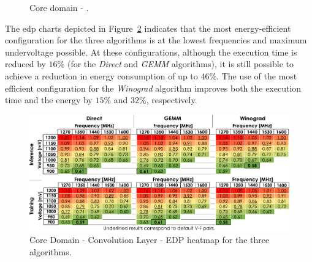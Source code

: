 \begin{figure}[htb]
  \begin{subfigmatrix}{2}
  \end{subfigmatrix}
  \caption{Core domain - .}
  \label{fig:Convolution_behaviour}
\end{figure}

The \acrshort{edp} charts depicted in Figure~\ref{fig:Convolution_EDP} indicates that the most energy-efficient configuration for the three algorithms is at the lowest frequencies and maximum undervoltage possible. At these configurations, although the execution time is reduced by $16\%$ (for the \textit{Direct} and \textit{GEMM} algorithms), it is still possible to achieve a reduction in energy consumption of up to $46\%$. The use of the most efficient configuration for the \textit{Winograd} algorithm improves both the execution time and the energy by $15\%$ and $32\%$, respectively.

\begin{figure}[htbp]
    \centering
        \includegraphics[width=1.0\textwidth]{Figures/Application To Deep Learning/Convolution_EDP.pdf}
        \caption{Core Domain - Convolution Layer - EDP heatmap for the three algorithms.}
    \label{fig:Convolution_EDP}
\end{figure}



